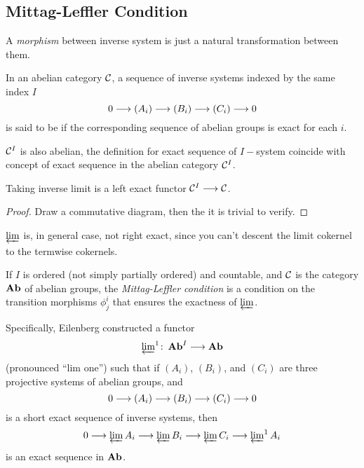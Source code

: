 \subsection{Mittag-Leffler Condition}
  \begin{defn}
    A \emph{\red morphism} between inverse system is just a natural transformation between them.
  \end{defn}

  \begin{defn}
    In an abelian category ${\cal C}$, a sequence of inverse systems indexed by the same index $I$
    \begin{equation*}
      0 \longrightarrow (A_i) \longrightarrow (B_i) \longrightarrow (C_i) \longrightarrow 0
    \end{equation*}
    is said to be  if the corresponding sequence of abelian groups is exact for each $i$.
  \end{defn}

  \begin{rem}
     ${\cal C}^I$ is also abelian, the definition for exact sequence of $I-$system coincide with concept of exact sequence in the abelian category ${\cal C}^I$.
  \end{rem}

  \begin{prop}
    Taking inverse limit is a left exact functor ${\cal C}^I\longrightarrow{\cal C}$.
  \end{prop}
  \begin{proof}
    Draw a commutative diagram, then the it is trivial to verify.
  \end{proof}
  \begin{warn}
    $\operatorname*{\underleftarrow{\lim}}$ is, in general case, not right exact, since you can't descent the limit cokernel to the termwise cokernels.
  \end{warn}

  If $I$ is ordered (not simply partially ordered) and countable, and ${\cal C}$ is the category $\operatorname{\mathbf{Ab}}$ of abelian groups, the \emph{Mittag-Leffler condition} is a condition on the transition morphisms $\phi^i_j$ that ensures the exactness of $\operatorname*{\underleftarrow{\lim}}$.

  Specifically, Eilenberg constructed a functor
  \begin{equation*}
    \operatorname*{\underleftarrow{\lim}}\nolimits^1\colon\operatorname{\mathbf{Ab}}^I\longrightarrow\operatorname{\mathbf{Ab}}
  \end{equation*}
  (pronounced ``lim one'') such that if $(A_i)$, $(B_i)$, and $(C_i)$ are three projective systems of abelian groups, and
    \begin{equation*}
      0 \longrightarrow (A_i) \longrightarrow (B_i) \longrightarrow (C_i) \longrightarrow 0
    \end{equation*}
  is a short exact sequence of inverse systems, then
    \begin{equation*}
      0 \longrightarrow \operatorname*{\underleftarrow{\lim}} A_i \longrightarrow \operatorname*{\underleftarrow{\lim}} B_i \longrightarrow \operatorname*{\underleftarrow{\lim}} C_i \longrightarrow \operatorname*{\underleftarrow{\lim}}\nolimits^1 A_i
    \end{equation*}
  is an exact sequence in $\operatorname{\mathbf{Ab}}$.

